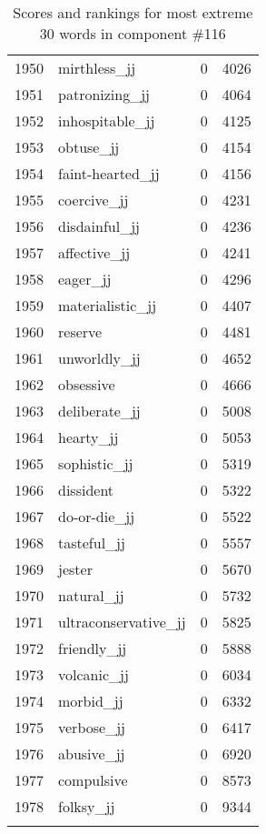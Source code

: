 \begin{longtable}[!htbp]{| rlr@{.}l |}
    1950 & mirthless\_jj & 0 & 4026 \\
    1951 & patronizing\_jj & 0 & 4064 \\
    1952 & inhospitable\_jj & 0 & 4125 \\
    1953 & obtuse\_jj & 0 & 4154 \\
    1954 & faint-hearted\_jj & 0 & 4156 \\
    1955 & coercive\_jj & 0 & 4231 \\
    1956 & disdainful\_jj & 0 & 4236 \\
    1957 & affective\_jj & 0 & 4241 \\
    1958 & eager\_jj & 0 & 4296 \\
    1959 & materialistic\_jj & 0 & 4407 \\
    1960 & reserve & 0 & 4481 \\
    1961 & unworldly\_jj & 0 & 4652 \\
    1962 & obsessive & 0 & 4666 \\
    1963 & deliberate\_jj & 0 & 5008 \\
    1964 & hearty\_jj & 0 & 5053 \\
    1965 & sophistic\_jj & 0 & 5319 \\
    1966 & dissident & 0 & 5322 \\
    1967 & do-or-die\_jj & 0 & 5522 \\
    1968 & tasteful\_jj & 0 & 5557 \\
    1969 & jester & 0 & 5670 \\
    1970 & natural\_jj & 0 & 5732 \\
    1971 & ultraconservative\_jj & 0 & 5825 \\
    1972 & friendly\_jj & 0 & 5888 \\
    1973 & volcanic\_jj & 0 & 6034 \\
    1974 & morbid\_jj & 0 & 6332 \\
    1975 & verbose\_jj & 0 & 6417 \\
    1976 & abusive\_jj & 0 & 6920 \\
    1977 & compulsive & 0 & 8573 \\
    1978 & folksy\_jj & 0 & 9344 \\
    \hline
    \caption{Scores and rankings for most extreme 30 words in component \#116} \\
\end{longtable}
